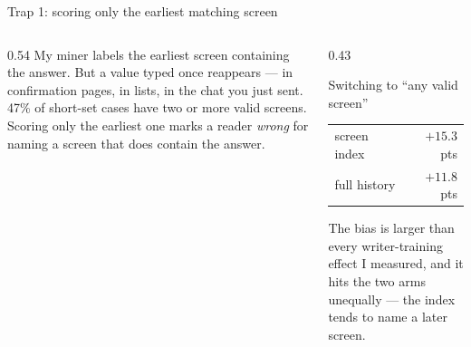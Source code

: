 \documentclass[aspectratio=169,10pt]{beamer}
\newcommand{\gr}[1]{{\color{ncgray}#1}}
\begin{document}
\begin{frame}{Trap 1: scoring only the earliest matching screen}
\vspace{0.35cm}
\begin{columns}[T]
\begin{column}{0.54\textwidth}
My miner labels the \alert{earliest} screen containing the answer. But a value typed once reappears --- in confirmation pages, in lists, in the chat you just sent.
\vspace{0.5em}
\alert{47\%} of short-set cases have two or more valid screens.
\vspace{0.5em}
Scoring only the earliest one marks a reader \emph{wrong} for naming a screen that does contain the answer.
\end{column}
\begin{column}{0.43\textwidth}
\begin{block}{Switching to ``any valid screen''}
\begin{tabular}{lr}
screen index & $+15.3$ pts\\
full history & $+11.8$ pts\\
\end{tabular}
\end{block}
\vspace{0.4em}
\gr{The bias is larger than every writer-training effect I measured, and it hits the two arms unequally --- the index tends to name a later screen.}
\end{column}
\end{columns}
\end{frame}
\end{document}
